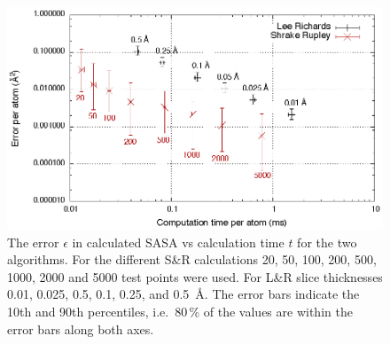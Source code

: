 \documentclass[a4paper,11pt]{article}
\begin{document}
\begin{figure}
  \begin{center}
  \includegraphics{fig/precision}
  \caption{The error $\epsilon$ in calculated SASA vs calculation time
    $t$ for the two algorithms. For the different S\&R calculations
    20, 50, 100, 200, 500, 1000, 2000 and 5000 test points were
    used. For L\&R slice thicknesses 0.01, 0.025, 0.5, 0.1, 0.25, and
    0.5~Å. The error bars indicate the 10th and 90th percentiles,
    i.e.\ $80\,\%$ of the values are within the error bars along both axes.
    \label{fig:precision}}
  \end{center}
\end{figure}
\end{document}
